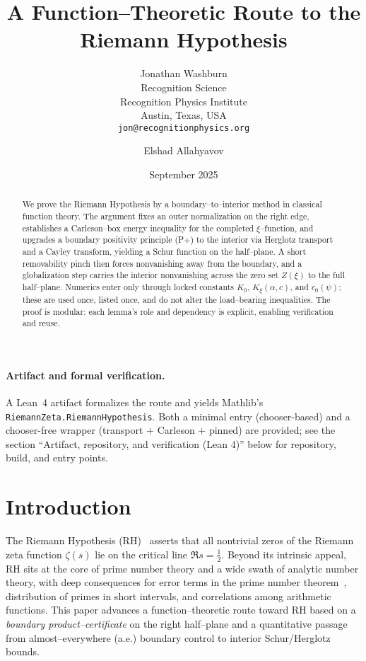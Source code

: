 \documentclass[11pt]{article}
\title{A Function--Theoretic Route to the Riemann Hypothesis}
\author{Jonathan Washburn\\
Recognition Science\\
Recognition Physics Institute\\
Austin, Texas, USA\\
\texttt{jon@recognitionphysics.org}
\and
Elshad Allahyavov}
\date{September 2025}
\theoremstyle{definition}
\theoremstyle{remark}
\begin{document}
\maketitle
\begin{abstract}
We prove the Riemann Hypothesis by a boundary--to--interior method in classical function theory. The argument fixes an outer normalization on the right edge, establishes a Carleson--box energy inequality for the completed $\xi$--function, and upgrades a boundary positivity principle (P+) to the interior via Herglotz transport and a Cayley transform, yielding a Schur function on the half--plane. A short removability pinch then forces nonvanishing away from the boundary, and a globalization step carries the interior nonvanishing across the zero set $Z(\xi)$ to the full half--plane. Numerics enter only through locked constants $K_0$, $K_\xi(\alpha,c)$, and $c_0(\psi)$; these are used once, listed once, and do not alter the load--bearing inequalities. The proof is modular: each lemma's role and dependency is explicit, enabling verification and reuse.
\end{abstract}

\vspace{0.25em}
\paragraph{Artifact and formal verification.}
A Lean~4 artifact formalizes the route and yields Mathlib's \texttt{RiemannZeta.RiemannHypothesis}. Both a minimal entry (chooser-based) and a chooser-free wrapper (transport + Carleson + pinned) are provided; see the section ``Artifact, repository, and verification (Lean 4)'' below for repository, build, and entry points.

\section{Introduction}
The Riemann Hypothesis (RH)~\cite{Titchmarsh,Ivic} asserts that all nontrivial zeros of the Riemann zeta function $\zeta(s)$
lie on the critical line $\Re s=\tfrac12$. Beyond its intrinsic appeal, RH sits at the core of prime number theory and a wide swath
of analytic number theory, with deep consequences for error terms in the prime number theorem~\cite{DavenportMNT,MontgomeryVaughan},
distribution of primes in short intervals, and correlations among arithmetic functions.
This paper advances a function--theoretic route toward RH based on a \emph{boundary product--certificate} on the
right half--plane
and a quantitative passage from almost--everywhere (a.e.) boundary control to interior Schur/Herglotz bounds.
\end{document}
